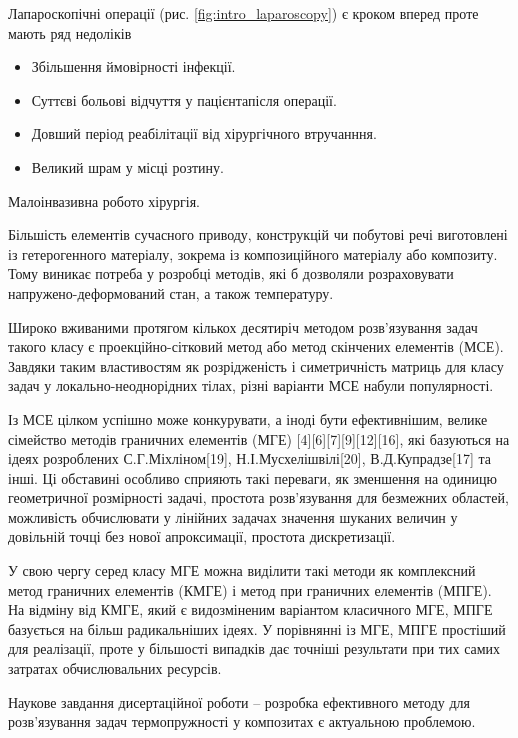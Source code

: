Лапароскопічні операції (рис. \ref{fig:intro_laparoscopy}) є кроком вперед проте мають ряд недоліків
\begin{itemize}
  \item Збільшення ймовірності інфекції.
  \item Суттєві больові відчуття у пацієнта після операції.
  \item Довший період реабілітації від хірургічного втручанння.
  \item Великий шрам у місці розтину.
\end{itemize}

Малоінвазивна робото хірургія. 

Більшість елементів сучасного приводу, конструкцій чи побутові речі виготовлені із гетерогенного матеріалу, зокрема із
композиційного матеріалу або композиту. Тому виникає потреба у розробці методів, які б дозволяли розраховувати
напружено-деформований стан, а також температуру.

Широко вживаними протягом кількох десятиріч методом розв'язування задач такого класу є проекційно-сітковий метод або
метод скінчених елементів (МСЕ). Завдяки таким властивостям як розрідженість і симетричність матриць для класу задач у
локально-неоднорідних тілах, різні варіанти МСЕ набули популярності.

Із МСЕ цілком успішно може конкурувати, а іноді бути ефективнішим, велике сімейство методів граничних елементів (МГЕ)
\cite{benerdge-et-al} {[}4{]}{[}6{]}{[}7{]}{[}9{]}{[}12{]}{[}16{]}, які базуються на ідеях розроблених
С.Г.Міхліном{[}19{]}, Н.І.Мусхелішвілі{[}20{]}, В.Д.Купрадзе{[}17{]} та інші. Ці обставині особливо сприяють такі
переваги, як зменшення на одиницю геометричної розмірності задачі, простота розв'язування для безмежних областей,
можливість обчислювати у лінійних задачах значення шуканих величин у довільній точці без нової апроксимації, простота
дискретизації.

У свою чергу серед класу МГЕ можна виділити такі методи як комплексний метод граничних елементів (КМГЕ) і метод при
граничних елементів (МПГЕ). На відміну від КМГЕ, який є видозміненим варіантом класичного МГЕ, МПГЕ базується на більш
радикальніших ідеях. У порівнянні із МГЕ, МПГЕ простіший для реалізації, проте у більшості випадків дає точніші
результати при тих самих затратах обчислювальних ресурсів.

Наукове завдання дисертаційної роботи -- розробка ефективного методу для розв'язування задач термопружності у композитах
є актуальною проблемою.

